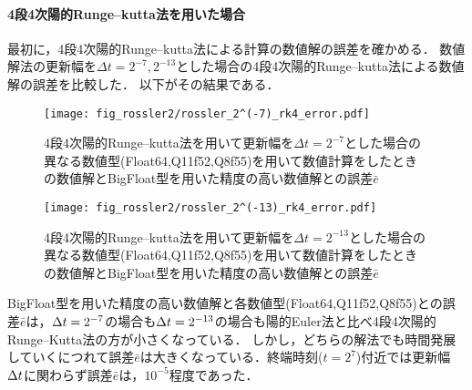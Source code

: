 \paragraph*{4段4次陽的Runge--kutta法を用いた場合}
最初に，4段4次陽的Runge--kutta法による計算の数値解の誤差を確かめる．
数値解法の更新幅を$\Delta t = 2^{-7},2^{-13}$とした場合の4段4次陽的Runge--kutta法による数値解の誤差を比較した．
以下がその結果である．
\begin{figure}[H]
    \centering
    \begin{minipage}[b]{0.48\columnwidth}
        \centering
        \texttt{[image: fig\_rossler2/rossler\_2^(-7)\_rk4\_error.pdf]}
        \caption{4段4次陽的Runge--kutta法を用いて更新幅を$\Delta t = 2^{-7}$とした場合の異なる数値型(Float64,Q11f52,Q8f55)を用いて数値計算をしたときの数値解とBigFloat型を用いた精度の高い数値解との誤差$\bar{e}$}
        \label{fig:rossler_2^(-7)_rk4_error}
    \end{minipage}
    \hspace{0.01\columnwidth}
    \begin{minipage}[b]{0.48\columnwidth}
        \centering
        \texttt{[image: fig\_rossler2/rossler\_2^(-13)\_rk4\_error.pdf]}
        \caption{4段4次陽的Runge--kutta法を用いて更新幅を$\Delta t =  2^{-13}$とした場合の異なる数値型(Float64,Q11f52,Q8f55)を用いて数値計算をしたときの数値解とBigFloat型を用いた精度の高い数値解との誤差$\bar{e}$}
        \label{fig:rossler_2^(-13)_rk4_error}
    \end{minipage}   
\end{figure}
BigFloat型を用いた精度の高い数値解と各数値型(Float64,Q11f52,Q8f55)との誤差$\bar{e}$は，$\Delta t = 2^{-7}$の場合も$\Delta t = 2^{-13}$の場合も陽的Euler法と比べ4段4次陽的Runge--Kutta法の方が小さくなっている．
しかし，どちらの解法でも時間発展していくにつれて誤差$\bar{e}$は大きくなっている．終端時刻($t=2^7$)付近では更新幅$\Delta t$に関わらず誤差$\bar{e}$は，$10^{-5}$程度であった．



